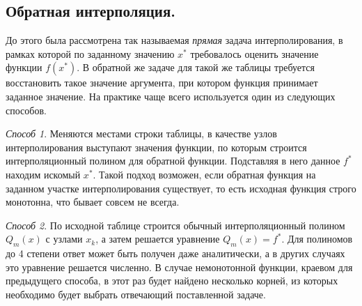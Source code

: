 \documentclass[../../calc-math-exam-2023.tex]{subfiles}
\begin{document}
    \subsection{Обратная интерполяция.}
    До этого была рассмотрена так называемая \emph{прямая} задача интерполирования, в рамках которой
    по заданному значению $x^{*}$ требовалось оценить значение функции $f(x^{*})$. В обратной же задаче
    для такой же таблицы требуется восстановить такое значение аргумента, при котором функция принимает
    заданное значение. На практике чаще всего используется один из следующих способов.

    \emph{Способ 1}. Меняются местами строки таблицы, в качестве узлов интерполирования выступают
    значения функции, по которым строится интерполяционный полином для обратной функции. Подставляя
    в него данное $f^{*}$ находим искомый $x^{*}$. Такой подход возможен, если обратная функция на
    заданном участке интерполирования существует, то есть исходная функция строго монотонна, что
    бывает совсем не всегда.

    \emph{Способ 2}. По исходной таблице строится обычный интерполяционный полином $Q_m(x)$ с
    узлами $x_k$, а затем решается уравнение $Q_m(x) = f^{*}$. Для полиномов до 4 степени
    ответ может быть получен даже аналитически, а в других случаях это уравнение решается численно.
    В случае немонотонной функции, краевом для предыдущего способа, в этот раз будет найдено несколько
    корней, из которых необходимо будет выбрать отвечающий поставленной задаче.
\end{document}

